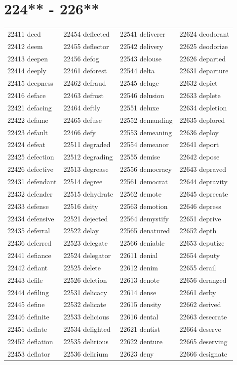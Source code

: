 \documentclass[10pt, oneside]{book}
\begin{document}
\begin{table}
	\centering
	\section*{224** - 226**}
	\begin{tabular}{l l l l}
22411 deed &22454 deflected &22541 deliverer &22624 deodorant\\
22412 deem &22455 deflector &22542 delivery &22625 deodorize\\
22413 deepen &22456 defog &22543 delouse &22626 departed\\
22414 deeply &22461 deforest &22544 delta &22631 departure\\
22415 deepness &22462 defraud &22545 deluge &22632 depict\\
22416 deface &22463 defrost &22546 delusion &22633 deplete\\
22421 defacing &22464 deftly &22551 deluxe &22634 depletion\\
22422 defame &22465 defuse &22552 demanding &22635 deplored\\
22423 default &22466 defy &22553 demeaning &22636 deploy\\
22424 defeat &22511 degraded &22554 demeanor &22641 deport\\
22425 defection &22512 degrading &22555 demise &22642 depose\\
22426 defective &22513 degrease &22556 democracy &22643 depraved\\
22431 defendant &22514 degree &22561 democrat &22644 depravity\\
22432 defender &22515 dehydrate &22562 demote &22645 deprecate\\
22433 defense &22516 deity &22563 demotion &22646 depress\\
22434 defensive &22521 dejected &22564 demystify &22651 deprive\\
22435 deferral &22522 delay &22565 denatured &22652 depth\\
22436 deferred &22523 delegate &22566 deniable &22653 deputize\\
22441 defiance &22524 delegator &22611 denial &22654 deputy\\
22442 defiant &22525 delete &22612 denim &22655 derail\\
22443 defile &22526 deletion &22613 denote &22656 deranged\\
22444 defiling &22531 delicacy &22614 dense &22661 derby\\
22445 define &22532 delicate &22615 density &22662 derived\\
22446 definite &22533 delicious &22616 dental &22663 desecrate\\
22451 deflate &22534 delighted &22621 dentist &22664 deserve\\
22452 deflation &22535 delirious &22622 denture &22665 deserving\\
22453 deflator &22536 delirium &22623 deny &22666 designate\\
	\end{tabular}
 \end{table}
\clearpage
\end{document}
